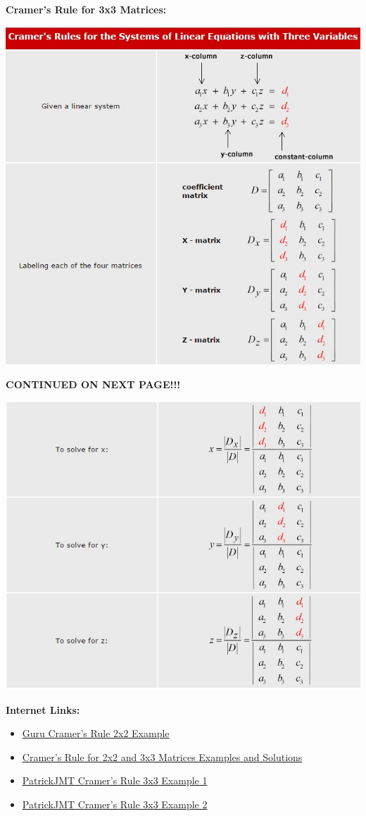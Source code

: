 \documentclass[12pt]{article}
\begin{document}
\newpage

\textbf{Cramer's Rule for 3x3 Matrices:}
\newline

\centerline{\includegraphics{CramersRule3By31.jpg}}

\textbf{CONTINUED ON NEXT PAGE!!!}

\centerline{\includegraphics{CramersRule3By32.jpg}}

\textbf{Internet Links:}
\begin{itemize}
\item \href{https://www.youtube.com/watch?v=cidMyv6L7Gs}{Guru Cramer's Rule 2x2 Example}
\item \href{http://www.chilimath.com/algebra/advanced/cramers/2x2.html}{Cramer's Rule for 2x2 and 3x3 Matrices Examples and Solutions}
\item \href{https://www.youtube.com/watch?v=TtxVGMWXMSE}{PatrickJMT Cramer's Rule 3x3 Example 1}
\item \href{https://www.youtube.com/watch?v=iMQRo0tHORw}{PatrickJMT Cramer's Rule 3x3 Example 2}

\end{itemize}
\end{document}
